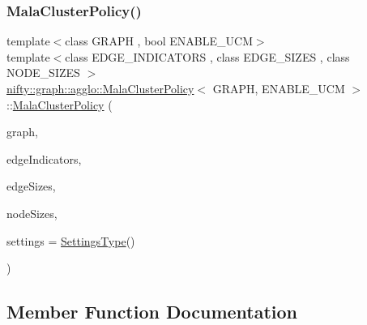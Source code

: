 \subsubsection{\texorpdfstring{Mala\+Cluster\+Policy()}{MalaClusterPolicy()}}
{\footnotesize\ttfamily template$<$class G\+R\+A\+PH , bool E\+N\+A\+B\+L\+E\+\_\+\+U\+CM$>$ \\
template$<$class E\+D\+G\+E\+\_\+\+I\+N\+D\+I\+C\+A\+T\+O\+RS , class E\+D\+G\+E\+\_\+\+S\+I\+Z\+ES , class N\+O\+D\+E\+\_\+\+S\+I\+Z\+ES $>$ \\
\hyperlink{classnifty_1_1graph_1_1agglo_1_1MalaClusterPolicy}{nifty\+::graph\+::agglo\+::\+Mala\+Cluster\+Policy}$<$ G\+R\+A\+PH, E\+N\+A\+B\+L\+E\+\_\+\+U\+CM $>$\+::\hyperlink{classnifty_1_1graph_1_1agglo_1_1MalaClusterPolicy}{Mala\+Cluster\+Policy} (\begin{DoxyParamCaption}\item[{const \hyperlink{classnifty_1_1graph_1_1agglo_1_1MalaClusterPolicy_ae2696b85f3f04787282e003bead20a5d}{Graph\+Type} \&}]{graph,  }\item[{const E\+D\+G\+E\+\_\+\+I\+N\+D\+I\+C\+A\+T\+O\+RS \&}]{edge\+Indicators,  }\item[{const E\+D\+G\+E\+\_\+\+S\+I\+Z\+ES \&}]{edge\+Sizes,  }\item[{const N\+O\+D\+E\+\_\+\+S\+I\+Z\+ES \&}]{node\+Sizes,  }\item[{const \hyperlink{structnifty_1_1graph_1_1agglo_1_1MalaClusterPolicy_1_1SettingsType}{Settings\+Type} \&}]{settings = {\ttfamily \hyperlink{structnifty_1_1graph_1_1agglo_1_1MalaClusterPolicy_1_1SettingsType}{Settings\+Type}()} }\end{DoxyParamCaption})\hspace{0.3cm}{\ttfamily [inline]}}



\subsection{Member Function Documentation}
\mbox{\label{classnifty_1_1graph_1_1agglo_1_1MalaClusterPolicy_a7001dcc73b1f93bcf5f2cbd1fa540dd8}} 
